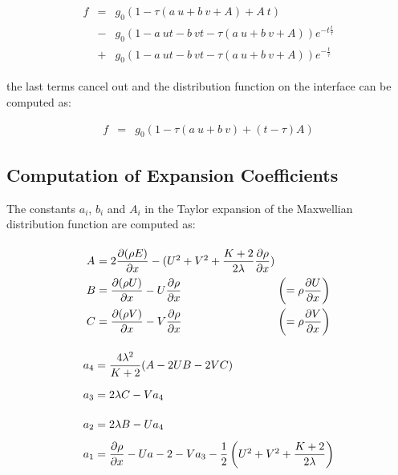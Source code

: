 \documentclass[
	pdftex,             %
	12pt,				%
	a4paper,		   	%
	english,				%
	oneside,			%
]{article}
\begin{document}
\begin{equation}
\begin{split}
\begin{array}{lcll}
f
&=&
g_0 \left( 1 - \tau (a~u + b~v + A) + A~t \right)
\\
&-&
g_0 \left( 1 - a~ut - b~vt - \tau(a~u + b~v + A) \right) e^{-t\tfrac{t}{\tau}}
\\
&+& 
g_0 \left( 1 - a~ut - b~vt - \tau \left( a~u + b~v + A \right) \right) e^{-\tfrac{t}{\tau}}
\end{array}
\end{split}
\end{equation}

the last terms cancel out and the distribution function on the interface can be computed as:

\begin{equation}
\begin{array}{lcl}
f &=& g_0 \left( 1 - \tau (a~u + b~v) + (t-\tau)A \right)
\end{array}
\end{equation}

\clearpage

\subsection*{Computation of Expansion Coefficients}

The constants $a_i$, $b_i$ and $A_i$ in the Taylor expansion of the Maxwellian distribution function are computed as:

\begin{eqnarray}
\begin{split}
\arraycolsep=1.4pt\def\arraystretch{2.2}
\begin{array}{lcll}
A &=& 2 \dfrac{\partial (\rho E)}{\partial x} 
  - ( U^2 + V^2 + \dfrac{K+2}{2\lambda} \dfrac{\partial\rho}{\partial x} ) &
\\
B &=& \dfrac{\partial (\rho U)}{\partial x} - U\dfrac{\partial \rho}{\partial x}
	&\left( = \rho \dfrac{\partial U}{\partial x} \right)
\\
C &=& \dfrac{\partial (\rho V)}{\partial x} - V\dfrac{\partial \rho}{\partial x}
	&\left( = \rho \dfrac{\partial V}{\partial x} \right)
\end{array}
\end{split}
\end{eqnarray}

\begin{eqnarray}
\begin{split}
\arraycolsep=1.4pt\def\arraystretch{2.2}
\begin{array}{lcl}
a_4 &=& \dfrac{4 \lambda^2}{K+2} ( A - 2 U B - 2 V C )
\\
a_3 &=& 2 \lambda C - V a_4
\\
a_2 &=& 2 \lambda B - U a_4
\\
a_1 &=& \dfrac{\partial \rho}{\partial x} - U a-2 - V a_3 - \dfrac{1}{2} \left( U^2 + V^2 + \dfrac{K+2}{2\lambda} \right)
\end{array}
\end{split}
\end{eqnarray}
\end{document}
